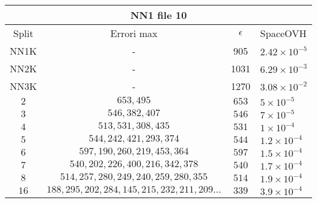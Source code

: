 \documentclass[]{article}
\begin{document}
\begin{center}
\begin{tabular}{| c | c | c | l |}
		\hline  
		
		\end{tabular}
		
		\vspace*{0.5 cm}

		\begin{tabular}{|c | c | c | l |}
			
			\multicolumn{4}{c}{NN1 file 10} \\
			\hline
			Split & Errori max & $\epsilon$ & SpaceOVH \\ \hline
			NN1K & - & 905 & $2.42 \times 10^{-5}$  \\ 
			NN2K & - & 1031 & $6.29 \times 10^{-3}$\\
			NN3K & - & 1270  & $3.08 \times 10^{-2}$ \\
			\hline
			$2$ & $653, 495$ & $653$ & $5\times 10^{-5}$ \\ 
			$3$ & $546, 382, 407$ & $546$ & $7\times 10^{-5}$ \\ 
			$4$ & $513, 531, 308, 435$ & $531$ & $1\times 10^{-4}$ \\ 
			$5$ & $544, 242, 421, 293, 374$ & $544$ & $1.2\times 10^{-4}$ \\ 
			$6$ & $597, 190, 260, 219, 453, 364$ & $597$ & $1.5\times 10^{-4}$ \\ 
			$7$ & $540, 202, 226, 400, 216, 342, 378$ & $540$ & $1.7\times 10^{-4}$ \\ 
			$8$ & $514, 257, 280, 249, 240, 259, 280, 355$ & $514$ & $1.9\times 10^{-4}$ \\
			$16$ & $188,295,202,284,145,215,232,211,209...$ & $339$ & $3.9\times 10^{-4}$ \\
			\hline  
		\end{tabular}
	\end{center}
\end{document}
